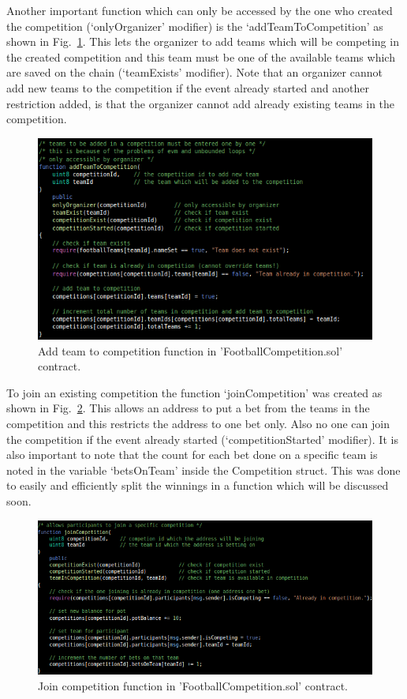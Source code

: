 \noindent
Another important function which can only be accessed by the one who created the competition (‘onlyOrganizer’ modifier) is the ‘addTeamToCompetition’ as shown in Fig.~\ref{fig:comp_sol_8}. This lets the organizer to add teams which will be competing in the created competition and this team must be one of the available teams which are saved on the chain (‘teamExists’ modifier). Note that an organizer cannot add new teams to the competition if the event already started and another restriction added, is that the organizer cannot add already existing teams in the competition.

\begin{figure}[H]
\centering
  \includegraphics[scale = .75]{imgs/comp_sol_8.png}
  \caption{Add team to competition function in 'FootballCompetition.sol' contract.}
  \label{fig:comp_sol_8}
\end{figure}

\noindent
To join an existing competition the function ‘joinCompetition’ was created as shown in Fig.~\ref{fig:comp_sol_9}. This allows an address to put a bet from the teams in the competition and this restricts the address to one bet only. Also no one can join the competition if the event already started (‘competitionStarted’ modifier). It is also important to note that the count for each bet done on a specific team is noted in the variable ‘betsOnTeam’ inside the Competition struct. This was done to easily and efficiently split the winnings in a function which will be discussed soon. 

\begin{figure}[H]
\centering
  \includegraphics[scale = .75]{imgs/comp_sol_9.png}
  \caption{Join competition function in 'FootballCompetition.sol' contract.}
  \label{fig:comp_sol_9}
\end{figure}

